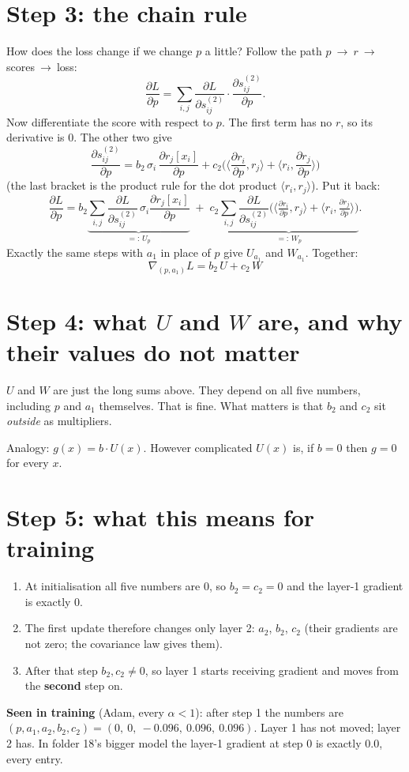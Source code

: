 \documentclass[11pt]{article}
\begin{document}
\section{Step 3: the chain rule}
How does the loss change if we change $p$ a little? Follow the path
$p\ \to\ r\ \to\ $scores$\ \to\ $loss:
\[
\frac{\partial L}{\partial p}=\sum_{i,j}\frac{\partial L}{\partial s^{(2)}_{ij}}\cdot\frac{\partial s^{(2)}_{ij}}{\partial p}.
\]
Now differentiate the score with respect to $p$. The first term has no $r$, so its derivative is 0. The
other two give
\[
\frac{\partial s^{(2)}_{ij}}{\partial p}
=b_2\,\sigma_i\,\frac{\partial r_j[x_i]}{\partial p}
+c_2\Big(\Big\langle\frac{\partial r_i}{\partial p},r_j\Big\rangle+\Big\langle r_i,\frac{\partial r_j}{\partial p}\Big\rangle\Big)
\]
(the last bracket is the product rule for the dot product $\langle r_i,r_j\rangle$). Put it back:
\[
\frac{\partial L}{\partial p}
=b_2\underbrace{\sum_{i,j}\frac{\partial L}{\partial s^{(2)}_{ij}}\,\sigma_i\frac{\partial r_j[x_i]}{\partial p}}_{=:\,U_p}
\;+\;c_2\underbrace{\sum_{i,j}\frac{\partial L}{\partial s^{(2)}_{ij}}\Big(\Big\langle\tfrac{\partial r_i}{\partial p},r_j\Big\rangle+\Big\langle r_i,\tfrac{\partial r_j}{\partial p}\Big\rangle\Big)}_{=:\,W_p}.
\]
Exactly the same steps with $a_1$ in place of $p$ give $U_{a_1}$ and $W_{a_1}$. Together:
\[
\boxed{\ \nabla_{(p,a_1)}L=b_2\,U+c_2\,W\ }
\]

\section{Step 4: what $U$ and $W$ are, and why their values do not matter}
$U$ and $W$ are just the long sums above. They depend on all five numbers, including $p$ and $a_1$
themselves. That is fine. What matters is that $b_2$ and $c_2$ sit \emph{outside} as multipliers.

Analogy: $g(x)=b\cdot U(x)$. However complicated $U(x)$ is, if $b=0$ then $g=0$ for every $x$.

\section{Step 5: what this means for training}
\begin{enumerate}
\item At initialisation all five numbers are $0$, so $b_2=c_2=0$ and the layer-1 gradient is exactly $0$.
\item The first update therefore changes only layer 2: $a_2$, $b_2$, $c_2$ (their gradients are not
zero; the covariance law gives them).
\item After that step $b_2,c_2\neq0$, so layer 1 starts receiving gradient and moves from the
\textbf{second} step on.
\end{enumerate}
\textbf{Seen in training} (Adam, every $\alpha<1$): after step 1 the numbers are
$(p,a_1,a_2,b_2,c_2)=(0,\ 0,\ -0.096,\ 0.096,\ 0.096)$. Layer 1 has not moved; layer 2 has. In folder
18's bigger model the layer-1 gradient at step 0 is exactly $0.0$, every entry.
\end{document}
